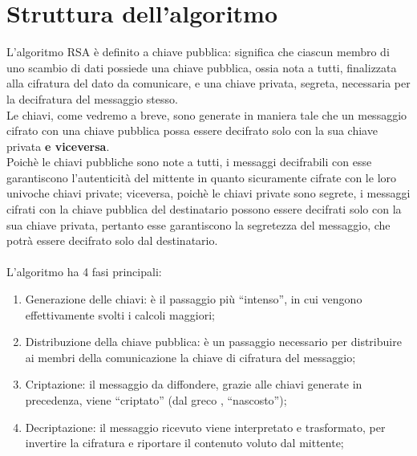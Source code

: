 \section{Struttura dell'algoritmo}
L'algoritmo RSA è definito a chiave pubblica: significa che ciascun membro di uno scambio di dati possiede una chiave pubblica, ossia nota a tutti, finalizzata alla cifratura del dato da comunicare, e una chiave privata, segreta, necessaria per la decifratura del messaggio stesso.\\
Le chiavi, come vedremo a breve, sono generate in maniera tale che un messaggio cifrato con una chiave pubblica possa essere decifrato solo con la sua chiave privata \textbf{e viceversa}.\\
Poichè le chiavi pubbliche sono note a tutti, i messaggi decifrabili con esse garantiscono l'autenticità del mittente in quanto sicuramente cifrate con le loro univoche chiavi private; viceversa, poichè le chiavi private sono segrete, i messaggi cifrati con la chiave pubblica del destinatario possono essere decifrati solo con la sua chiave privata, pertanto esse garantiscono la segretezza del messaggio, che potrà essere decifrato solo dal destinatario.\\\\
L'algoritmo ha 4 fasi principali:
\begin{enumerate}
    \item Generazione delle chiavi: è il passaggio più ``intenso'', in cui vengono effettivamente svolti i calcoli maggiori;
    \item Distribuzione della chiave pubblica: è un passaggio necessario per distribuire ai membri della comunicazione la chiave di cifratura del messaggio;
    \item Criptazione: il messaggio da diffondere, grazie alle chiavi generate in precedenza, viene ``criptato'' (dal greco \textkappa \textrho \textupsilon \textpi \texttau \textomikron \textvarsigma, ``nascosto'');
    \item Decriptazione: il messaggio ricevuto viene interpretato e trasformato, per invertire la cifratura e riportare il contenuto voluto dal mittente;
\end{enumerate}



